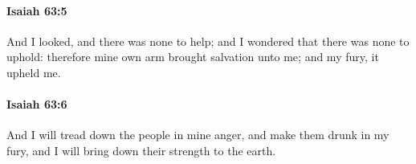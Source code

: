 		\paragraph{Isaiah 63:5} %
			\label{ISAIAH-63-5}

			And I looked, and there was none to help; and I wondered that there was none to uphold: therefore mine own arm brought salvation unto me; and my fury, it upheld me.


		\paragraph{Isaiah 63:6} %
			\label{ISAIAH-63-6}

			And I will tread down the people in mine anger, and make them drunk in my fury, and I will bring down their strength to the earth.



